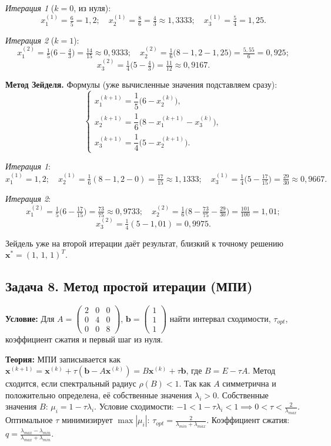 \documentclass{article}
\begin{document}
\textit{Итерация 1} ($k=0$, из нуля):
$$x_1^{(1)} = \tfrac{6}{5} = 1,2; \quad x_2^{(1)} = \tfrac{8}{6} = \tfrac{4}{3} \approx 1,3333; \quad x_3^{(1)} = \tfrac{5}{4} = 1,25.$$

\textit{Итерация 2} ($k=1$):
$$x_1^{(2)} = \tfrac{1}{5}\bigl(6 - \tfrac{4}{3}\bigr) = \tfrac{14}{15} \approx 0,9333; \quad x_2^{(2)} = \tfrac{1}{6}\bigl(8 - 1,2 - 1,25\bigr) = \tfrac{5,55}{6} = 0,925;$$
$$x_3^{(2)} = \tfrac{1}{4}\bigl(5 - \tfrac{4}{3}\bigr) = \tfrac{11}{12} \approx 0,9167.$$

\textbf{Метод Зейделя.} Формулы (уже вычисленные значения подставляем сразу):
$$
\begin{cases}
x_1^{(k+1)} = \dfrac{1}{5}\bigl(6 - x_2^{(k)}\bigr), \\[6pt]
x_2^{(k+1)} = \dfrac{1}{6}\bigl(8 - x_1^{(k+1)} - x_3^{(k)}\bigr), \\[6pt]
x_3^{(k+1)} = \dfrac{1}{4}\bigl(5 - x_2^{(k+1)}\bigr).
\end{cases}
$$

\textit{Итерация 1}:
$$x_1^{(1)} = 1,2; \quad x_2^{(1)} = \tfrac{1}{6}(8 - 1,2 - 0) = \tfrac{17}{15} \approx 1,1333; \quad x_3^{(1)} = \tfrac{1}{4}\bigl(5 - \tfrac{17}{15}\bigr) = \tfrac{29}{30} \approx 0,9667.$$

\textit{Итерация 2}:
$$x_1^{(2)} = \tfrac{1}{5}\bigl(6 - \tfrac{17}{15}\bigr) = \tfrac{73}{75} \approx 0,9733; \quad x_2^{(2)} = \tfrac{1}{6}\bigl(8 - \tfrac{73}{75} - \tfrac{29}{30}\bigr) = \tfrac{101}{100} = 1,01;$$
$$x_3^{(2)} = \tfrac{1}{4}(5 - 1,01) = 0,9975.$$

Зейдель уже на второй итерации даёт результат, близкий к точному решению $\textbf{x}^* = (1,\, 1,\, 1)^T$.


\subsection*{Задача 8. Метод простой итерации (МПИ)}
\textbf{Условие:} Для $A = \begin{pmatrix} 2 & 0 & 0 \\ 0 & 4 & 0 \\ 0 & 0 & 8 \end{pmatrix}$, $\textbf{b} = \begin{pmatrix} 1 \\ 1 \\ 1 \end{pmatrix}$ найти интервал сходимости, $\tau_{opt}$, коэффициент сжатия и первый шаг из нуля.

\textbf{Теория:}
МПИ записывается как $\textbf{x}^{(k+1)} = \textbf{x}^{(k)} + \tau (\textbf{b} - A\textbf{x}^{(k)}) = B\textbf{x}^{(k)} + \tau\textbf{b}$, где $B = E - \tau A$.
Метод сходится, если спектральный радиус $\rho(B) < 1$. Так как $A$ симметрична и положительно определена, её собственные значения $\lambda_i > 0$.
Собственные значения $B$: $\mu_i = 1 - \tau \lambda_i$.
Условие сходимости: $-1 < 1 - \tau \lambda_i < 1 \implies 0 < \tau < \frac{2}{\lambda_{max}}$.
Оптимальное $\tau$ минимизирует $\max |\mu_i|$: $\tau_{opt} = \frac{2}{\lambda_{min} + \lambda_{max}}$.
Коэффициент сжатия: $q = \frac{\lambda_{max} - \lambda_{min}}{\lambda_{max} + \lambda_{min}}$.
\end{document}
